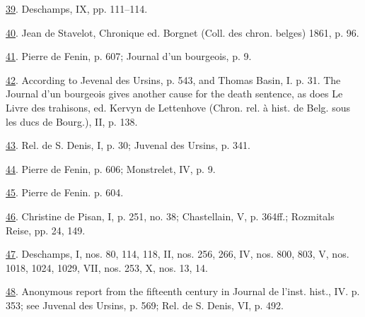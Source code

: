 \protect\hypertarget{23_NOTES.xhtmlux5cux23id_2010}{\protect\hyperlink{09_Chapter_Two__THE_CRAVING_FOR_A_M.xhtmlux5cux23id_2009}{39}}.
Deschamps, IX, pp. 111--114.

\protect\hypertarget{23_NOTES.xhtmlux5cux23page_403}{\protect\hyperlink{09_Chapter_Two__THE_CRAVING_FOR_A_M.xhtmlux5cux23id_2008}{40}}.
Jean de Stavelot, Chronique ed. Borgnet (Coll. des chron. belges) 1861,
p. 96.

\protect\hypertarget{23_NOTES.xhtmlux5cux23id_2007}{\protect\hyperlink{09_Chapter_Two__THE_CRAVING_FOR_A_M.xhtmlux5cux23id_2006}{41}}.
Pierre de Fenin, p. 607; Journal d'un bourgeois, p. 9.

\protect\hypertarget{23_NOTES.xhtmlux5cux23id_2005}{\protect\hyperlink{09_Chapter_Two__THE_CRAVING_FOR_A_M.xhtmlux5cux23id_2004}{42}}.
According to Jevenal des Ursins, p. 543, and Thomas Basin, I. p. 31. The
Journal d'un bourgeois gives another cause for the death sentence, as
does Le Livre des trahisons, ed. Kervyn de Lettenhove (Chron. rel. à
hist. de Belg. sous les ducs de Bourg.), II, p. 138.

\protect\hypertarget{23_NOTES.xhtmlux5cux23id_2003}{\protect\hyperlink{09_Chapter_Two__THE_CRAVING_FOR_A_M.xhtmlux5cux23id_2002}{43}}.
Rel. de S. Denis, I, p. 30; Juvenal des Ursins, p. 341.

\protect\hypertarget{23_NOTES.xhtmlux5cux23id_2001}{\protect\hyperlink{09_Chapter_Two__THE_CRAVING_FOR_A_M.xhtmlux5cux23id_2000}{44}}.
Pierre de Fenin, p. 606; Monstrelet, IV, p. 9.

\protect\hypertarget{23_NOTES.xhtmlux5cux23id_1999}{\protect\hyperlink{09_Chapter_Two__THE_CRAVING_FOR_A_M.xhtmlux5cux23id_1998}{45}}.
Pierre de Fenin. p. 604.

\protect\hypertarget{23_NOTES.xhtmlux5cux23id_1997}{\protect\hyperlink{09_Chapter_Two__THE_CRAVING_FOR_A_M.xhtmlux5cux23id_1996}{46}}.
Christine de Pisan, I, p. 251, no. 38; Chastellain, V, p. 364ff.;
Rozmitals Reise, pp. 24, 149.

\protect\hypertarget{23_NOTES.xhtmlux5cux23id_1995}{\protect\hyperlink{09_Chapter_Two__THE_CRAVING_FOR_A_M.xhtmlux5cux23id_1994}{47}}.
Deschamps, I, nos. 80, 114, 118, II, nos. 256, 266, IV, nos. 800, 803,
V, nos. 1018, 1024, 1029, VII, nos. 253, X, nos. 13, 14.

\protect\hypertarget{23_NOTES.xhtmlux5cux23id_1993}{\protect\hyperlink{09_Chapter_Two__THE_CRAVING_FOR_A_M.xhtmlux5cux23id_1992}{48}}.
Anonymous report from the fifteenth century in Journal de l'inst. hist.,
IV. p. 353; see Juvenal des Ursins, p. 569; Rel. de S. Denis, VI, p.
492.

